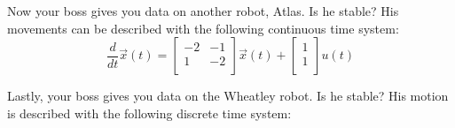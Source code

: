 \begin{enumerate}
{}

\qitem
Now your boss gives you data on another robot, Atlas.
Is he stable?
His movements can be described with the following continuous time system:\\

\begin{equation*}
    \frac{d}{dt}\vec{x}(t) =
    \begin{bmatrix}
    -2 & -1\\
    1 & -2\\
    \end{bmatrix}
    \vec{x}(t) +
    \begin{bmatrix}
    1\\
    1\\
    \end{bmatrix}
    u(t)
\end{equation*}


\qitem Lastly, your boss gives you data on the Wheatley robot. Is he stable?
His motion is described with the following discrete time system:\\


\end{enumerate}
